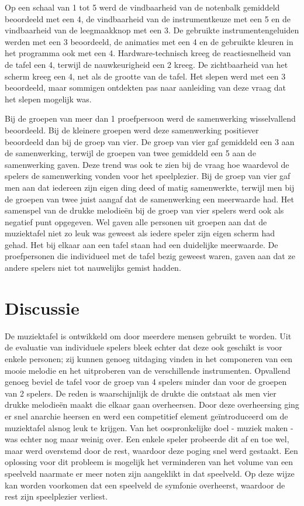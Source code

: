 \documentclass{acm}
\begin{document}
Op een schaal van 1 tot 5 werd de vindbaarheid van de notenbalk gemiddeld beoordeeld met een 4, de vindbaarheid van de instrumentkeuze met een 5 en de vindbaarheid van de leegmaakknop met een 3. De gebruikte instrumentengeluiden werden met een 3 beoordeeld, de animaties met een 4 en de gebruikte kleuren in het programma ook met een 4. Hardware-technisch kreeg de reactiesnelheid van de tafel een 4, terwijl de nauwkeurigheid een 2 kreeg. De zichtbaarheid van het scherm kreeg een 4, net als de grootte van de tafel. Het slepen werd met een 3 beoordeeld, maar sommigen ontdekten pas naar aanleiding van deze vraag dat het slepen mogelijk was.

Bij de groepen van meer dan 1 proefpersoon werd de samenwerking wisselvallend beoordeeld. Bij de kleinere groepen werd deze samenwerking positiever beoordeeld dan bij de groep van vier. De groep van vier gaf gemiddeld een 3 aan de samenwerking, terwijl de groepen van twee gemiddeld een 5 aan de samenwerking gaven. Deze trend was ook te zien bij de vraag hoe waardevol de spelers de samenwerking vonden voor het speelplezier. Bij de groep van vier gaf men aan dat iedereen zijn eigen ding deed of matig samenwerkte, terwijl men bij de groepen van twee juist aangaf dat de samenwerking een meerwaarde had. Het samenspel van de drukke melodieën bij de groep van vier spelers werd ook als negatief punt opgegeven. Wel gaven alle personen uit groepen aan dat de muziektafel niet zo leuk was geweest als iedere speler zijn eigen scherm had gehad. Het bij elkaar aan een tafel staan had een duidelijke meerwaarde. De proefpersonen die individueel met de tafel bezig geweest waren, gaven aan dat ze andere spelers niet tot nauwelijks gemist hadden.

\section{Discussie}
\label{sec_discussie}
De muziektafel is ontwikkeld om door meerdere mensen gebruikt te worden. Uit de evaluatie van individuele spelers bleek echter dat deze ook geschikt is voor enkele personen; zij kunnen genoeg uitdaging vinden in het componeren van een mooie melodie en het uitproberen van de verschillende instrumenten. Opvallend genoeg beviel de tafel voor de groep van 4 spelers minder dan voor de groepen van 2 spelers. De reden is waarschijnlijk de drukte die ontstaat als men vier drukke melodieën maakt die elkaar gaan overheersen. Door deze overheersing ging er snel anarchie heersen en werd een competitief element geïntroduceerd om de muziektafel alsnog leuk te krijgen. Van het oospronkelijke doel - muziek maken - was echter nog maar weinig over. Een enkele speler probeerde dit af en toe wel, maar werd overstemd door de rest, waardoor deze poging snel werd gestaakt. Een oplossing voor dit probleem is mogelijk het verminderen van het volume van een speelveld naarmate er meer noten zijn aangeklikt in dat speelveld. Op deze wijze kan worden voorkomen dat een speelveld de symfonie overheerst, waardoor de rest zijn speelplezier verliest.
\end{document}
